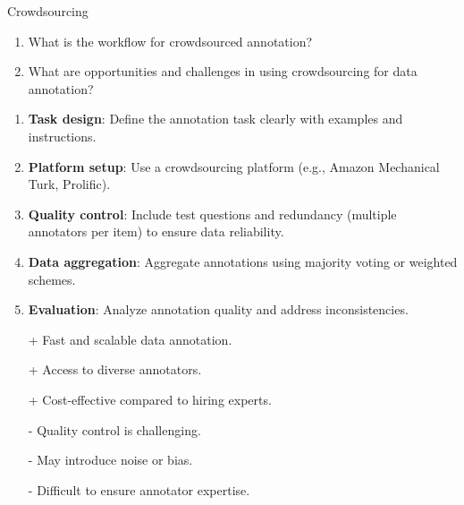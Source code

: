 \documentclass{article}
\begin{document}
\begin{exercise}{Crowdsourcing}\label{ex:crowdsourcing}
  \begin{enumerate}
    \item What is the workflow for crowdsourced annotation?
    \item What are opportunities and challenges in using crowdsourcing for data annotation?
  \end{enumerate}

  \begin{solution}
    \begin{enumerate}
        \item \textbf{Task design}: Define the annotation task clearly with examples and instructions.
        \item \textbf{Platform setup}: Use a crowdsourcing platform (e.g., Amazon Mechanical Turk, Prolific).
        \item \textbf{Quality control}: Include test questions and redundancy (multiple annotators per item) to ensure data reliability.
        \item \textbf{Data aggregation}: Aggregate annotations using majority voting or weighted schemes.
        \item \textbf{Evaluation}: Analyze annotation quality and address inconsistencies.
    \end{enumerate}
    \begin{itemize}
        \item[+] Fast and scalable data annotation.
        \item[+] Access to diverse annotators.
        \item[+] Cost-effective compared to hiring experts.
        \item[-] Quality control is challenging.
        \item[-] May introduce noise or bias.
        \item[-] Difficult to ensure annotator expertise.
    \end{itemize}
  \end{solution}
\end{exercise}
\end{document}
